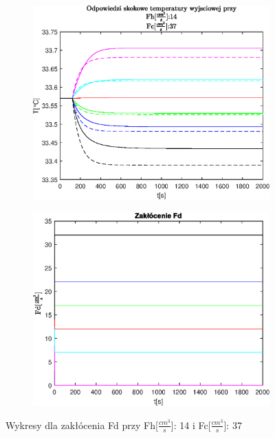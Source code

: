\begin{figure}[h!]
   \begin{subfigure}[b]{0.6\textwidth}
      \includegraphics[width=1\linewidth]{img/step-responses-fd/stepResponseToutFhFd.eps}
      \caption{}
      \label{fig:fig:stepResponsesFhFd3}
   \end{subfigure}
       
   \begin{subfigure}[b]{0.6\textwidth}
      \includegraphics[width=1\linewidth]{img/step-responses-fd/stepResponseUFd.eps}
      \caption{}
      \label{fig:fig:stepResponsesFhFd4}
   \end{subfigure}
       
   \caption{Wykresy dla zakłócenia Fd przy Fh[$\frac{cm^3}{s}$]: 14 i  Fc[$\frac{cm^3}{s}$]: 37}
   \label{fig:stepResponsesFhFd}
\end{figure}
           
